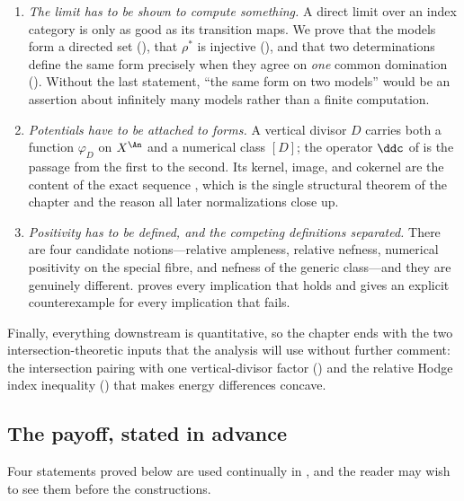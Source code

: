 \begin{enumerate}
\item\label{itm:ch20-plan:limit}
 \emph{The limit has to be shown to compute something.}  A direct limit over
 an index category is only as good as its transition maps.  We prove that
 the models form a directed set (), that
 \(\rho^*\) is injective (), and that two
 determinations define the same form precisely when they agree on
 \emph{one} common domination
 ().  Without the last statement,
 ``the same form on two models'' would be an assertion about infinitely many
 models rather than a finite computation.
\item\label{itm:ch20-plan:ddc}
 \emph{Potentials have to be attached to forms.}  A vertical divisor \(D\)
 carries both a function \(\varphi_D\) on \(X^{\An}\) and a numerical class
 \([D]\); the operator \(\ddc\) of  is the passage from
 the first to the second.  Its kernel, image, and cokernel are the content
 of the exact sequence , which is the single
 structural theorem of the chapter and the reason all later normalizations
 close up.
\item\label{itm:ch20-plan:positivity}
 \emph{Positivity has to be defined, and the competing definitions
 separated.}  There are four candidate notions---relative ampleness,
 relative nefness, numerical positivity on the special fibre, and nefness of
 the generic class---and they are genuinely different.
  proves every implication that holds and gives an
 explicit counterexample for every implication that fails.
\end{enumerate}

Finally, everything downstream is quantitative, so the chapter ends with the
two intersection-theoretic inputs that the analysis will use without further
comment: the intersection pairing with one vertical-divisor factor
() and the relative Hodge index inequality
() that makes energy differences concave.

\subsection{The payoff, stated in advance}
\label{sec:ch20-payoff}

Four statements proved below are used continually in
, and the reader may wish to see
them before the constructions.

